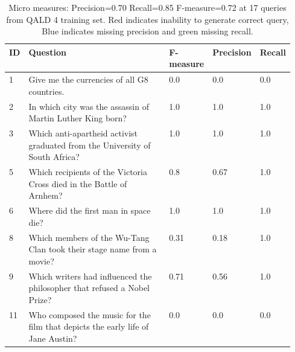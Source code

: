 \begin{table*}[htb!]
\caption{Micro measures: Precision=0.70 Recall=0.85 F-measure=0.72 at 17 queries from QALD 4 training set. Red indicates inability to generate correct query, Blue indicates missing precision and green missing recall.}
\begin{tabular*}{\linewidth}{@{\extracolsep{\fill} } @{}lp{0.55\linewidth}lll@{}}
\toprule
\textbf{ID} & \textbf{Question}                                                                                 & \textbf{F-measure} & \textbf{Precision} & \textbf{Recall} \\ \midrule
\rowcolor[HTML]{FFCCC9} 
1           & Give me the currencies of all G8 countries.                                                       & 0.0                & 0.0                & 0.0             \\
2           & In which city was the assassin of Martin Luther King born?                                        & 1.0                & 1.0                & 1.0             \\
3           & Which anti-apartheid activist graduated from the University of South Africa?                      & 1.0                & 1.0                & 1.0             \\
\rowcolor[HTML]{BBDAFF} 
5           & Which recipients of the Victoria Cross died in the Battle of Arnhem?                              & 0.8                & 0.67               & 1.0             \\
6           & Where did the first man in space die?                                                             & 1.0                & 1.0                & 1.0             \\
\rowcolor[HTML]{BBDAFF} 
8           & Which members of the Wu-Tang Clan took their stage name from a movie?                             & 0.31               & 0.18               & 1.0             \\
\rowcolor[HTML]{BBDAFF} 
9           & Which writers had influenced the philosopher that refused a Nobel Prize?                          & 0.71               & 0.56               & 1.0             \\
\rowcolor[HTML]{FFCCC9} 
11          & Who composed the music for the film that depicts the early life of Jane Austin?                   & 0.0                & 0.0                & 0.0             \\

\end{tabular*}
\end{table*}
